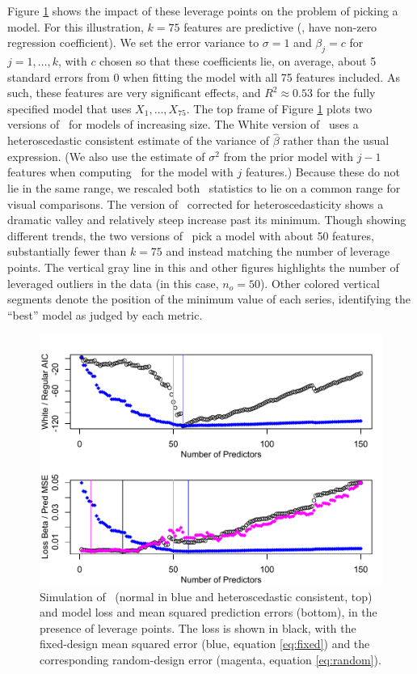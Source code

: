 \documentclass[12pt]{article}
\begin{document}
 Figure \ref{fig:example1} shows the impact of these leverage points on the
 problem of picking a model.  For this illustration, $k = 75$ features are
 predictive (\ie, have non-zero regression coefficient).  We set the error
 variance to $\sigma=1$ and $\beta_j = c$ for $j = 1,\ldots,k$, with $c$ chosen
 so that these coefficients lie, on average, about 5 standard errors from 0 when
 fitting the model with all 75 features included.  As such, these features are
 very significant effects, and $R^2 \approx 0.53$ for the fully specified model
 that uses $X_1,\ldots,X_{75}$.  The top frame of Figure \ref{fig:example1}
 plots two versions of \aic\ for models of increasing size.  The White version
 of \aic\ uses a heteroscedastic consistent estimate of the variance of
 $\hat\beta$ rather than the usual expression. (We also use the estimate of
 $\sigma^2$ from the prior model with $j-1$ features when computing \aic\ for
 the model with $j$ features.)  Because these do not lie in the same range, we
 rescaled both \aic\ statistics to lie on a common range for visual comparisons.
  The version of \aic\ corrected for heteroscedasticity shows a dramatic valley
 and relatively steep increase past its minimum.  Though showing different
 trends, the two versions of \aic\ pick a model with about 50 features,
 substantially fewer than $k=75$ and instead matching the number of leverage
 points.  The vertical gray line in this and other figures highlights the number
 of leveraged outliers in the data (in this case, $n_o=50$).  Other colored
 vertical segments denote the position of the minimum value of each series,
 identifying the ``best'' model as judged by each metric.

 \begin{figure}
 \caption{ Simulation of \aic\ (normal in blue and heteroscedastic consistent,
 top) and model loss and mean squared prediction errors (bottom), in the
 presence of leverage points.  The loss is shown in black, with the fixed-design
 mean squared error (blue, equation \ref{eq:fixed}) and the corresponding
 random-design error (magenta, equation \ref{eq:random}). }
 \label{fig:example1}
  \centerline{ \includegraphics[width=5in]{figures/leverage/example1.pdf} }
 \end{figure}
\end{document}

